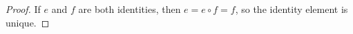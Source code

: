 \begin{proof}
    If $e$ and $f$ are both identities, then $e = e\circ f = f$, so the identity element is unique.
\end{proof}